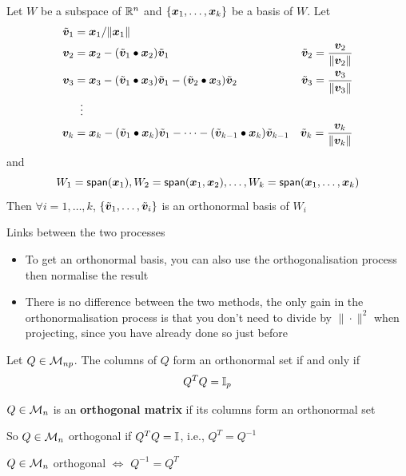 \documentclass[aspectratio=169]{beamer}\usepackage[]{graphicx}\usepackage[]{xcolor}
\begin{document}
\begin{frame}
\begin{importanttheorem}
Let $W$ be a subspace of $\mathbb{R}^n$ and $\{\bm{x}_1,\ldots,\bm{x}_k\}$ be a basis of $W$. 
Let
\begin{align*}
\tilde{\bm{v}}_1 &= \bm{x}_1/\|\bm{x}_1\| \\
\bm{v}_2 &= \bm{x}_2 -(\tilde{\bm{v}}_1\bullet\bm{x}_2)\tilde{\bm{v}}_1  &
\tilde{\bm{v}}_2 = \frac{\bm{v}_2}{\|\bm{v}_2\|} \\
\bm{v}_3 &= \bm{x}_3 -(\tilde{\bm{v}}_1\bullet\bm{x}_3)\tilde{\bm{v}}_1 -(\tilde{\bm{v}}_2\bullet\bm{x}_3)\tilde{\bm{v}}_2 &
\tilde{\bm{v}}_3 = \frac{\bm{v}_3}{\|\bm{v}_3\|} \\
&\;\;\vdots & \\
\bm{v}_k &= \bm{x}_k -(\tilde{\bm{v}}_1\bullet\bm{x}_k)\tilde{\bm{v}}_1 
-\cdots-(\tilde{\bm{v}}_{k-1}\bullet\bm{x}_k)\tilde{\bm{v}}_{k-1}
& \tilde{\bm{v}}_k = \frac{\bm{v}_k}{\|\bm{v}_k\|}
\end{align*}
and
\[
W_1=\mathsf{span}(\bm{x}_1),W_2 = \mathsf{span}(\bm{x}_1,\bm{x}_2),\ldots,
W_k = \mathsf{span}(\bm{x}_1,\ldots,\bm{x}_k)
\]
Then $\forall i=1,\ldots,k$, $\{\tilde{\bm{v}}_1,\ldots,\tilde{\bm{v}}_i\}$ is an orthonormal basis of $W_i$
\end{importanttheorem}
\end{frame}

\begin{frame}{Links between the two processes}
\begin{itemize}
\item To get an orthonormal basis, you can also use the orthogonalisation process then normalise the result
\vfill
\item There is no difference between the two methods, the only gain in the orthonormalisation process is that you don't need to divide by $\|\cdot\|^2$ when projecting, since you have already done so just before
\end{itemize}
\end{frame}



\begin{frame}
\begin{importanttheorem}
Let $Q\in\mathcal{M}_{np}$. The columns of $Q$ form an orthonormal set if and only if
\[
Q^TQ=\mathbb{I}_p
\]
\end{importanttheorem}
\vfill
\begin{importantdefinition}
$Q\in\mathcal{M}_n$ is an \textbf{orthogonal matrix} if its columns form an orthonormal set 
\end{importantdefinition}
So $Q\in\mathcal{M}_n$ orthogonal if $Q^TQ=\mathbb{I}$, i.e., $Q^T=Q^{-1}$
\vfill
\begin{importanttheorem}
$Q\in\mathcal{M}_n$ orthogonal $\iff$ $Q^{-1} = Q^T$
\end{importanttheorem}
\end{frame}
\end{document}
